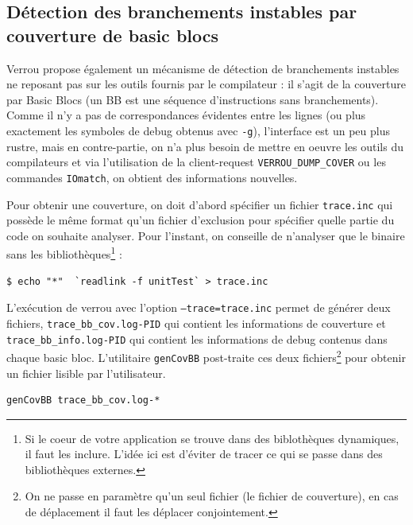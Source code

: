 \documentclass[a4paper]{article}
\begin{document}
\subsection{Détection des branchements instables par couverture de basic blocs}

 Verrou propose également un mécanisme de détection de branchements instables
 ne reposant pas sur les outils fournis par le compilateur : il s'agit de la couverture par
 Basic Blocs (un BB est une séquence d'instructions sans branchements). Comme il n'y a pas de
 correspondances évidentes entre les lignes (ou plus exactement les symboles de debug obtenus
 avec \texttt{-g}), l'interface est un peu plus rustre, mais en contre-partie, on n'a plus besoin de
 mettre en oeuvre les outils du compilateurs et via l'utilisation de la client-request
 \texttt{VERROU\_DUMP\_COVER} ou les commandes \texttt{IOmatch}, on obtient des informations nouvelles.

 
 Pour obtenir une couverture, on doit d'abord spécifier un fichier \texttt{trace.inc} qui possède le même format qu'un fichier
 d'exclusion pour spécifier quelle partie du code on souhaite
 analyser. Pour l'instant, on conseille de n'analyser que le binaire
 sans les bibliothèques\footnote{Si le coeur de votre application se
   trouve dans des biblothèques dynamiques, il faut les
   inclure. L'idée ici est d'éviter de tracer ce qui se passe dans des
 bibliothèques externes.} :
\begin{verbatim}
$ echo "*"  `readlink -f unitTest` > trace.inc
\end{verbatim}

L'exécution de verrou avec l'option \texttt{--trace=trace.inc} permet de générer deux fichiers, \texttt{trace\_bb\_cov.log-PID} qui contient les informations de couverture
et \texttt{trace\_bb\_info.log-PID} qui contient les informations de debug contenus dans chaque basic bloc.
L'utilitaire \texttt{genCovBB} post-traite ces deux fichiers\footnote{On ne passe en paramètre qu'un seul fichier (le fichier de couverture), en cas de déplacement il faut les déplacer conjointement.} pour obtenir un fichier lisible par l'utilisateur. 
\begin{verbatim}
genCovBB trace_bb_cov.log-*
\end{verbatim}
\end{document}
